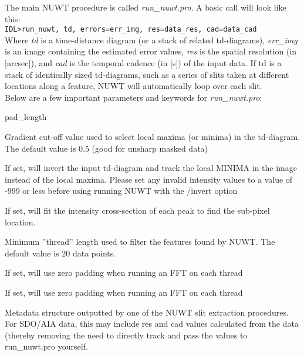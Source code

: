 \documentclass{article}
\begin{document}
The main NUWT procedure is called \textit{run\_nuwt.pro}. A basic call will look like this: \\

\hspace{0.5cm} \texttt{IDL\textgreater run\_nuwt, td, errors=err\_img, res=data\_res, cad=data\_cad} \\

Where \textit{td} is a time-distance diagram (or a stack of related td-diagrams), \textit{err\_img} is an image containing the estimated error values, \textit{res} is the spatial resolution (in [arcsec]), and \textit{cad} is the temporal cadence (in [s]) of the input data. If td is a stack of identically sized td-diagrams, such as a series of slits taken at different locations along a feature, NUWT will automatically loop over each slit. \\

Below are a few important parameters and keywords for \textit{run\_nuwt.pro}: \\

\begin{labeling}{pad\_length}
\item [grad] Gradient cut-off value used to select local maxima (or minima) in the td-diagram. The default value is 0.5 (good for unsharp masked data)
\item [/invert] If set, will invert the input td-diagram and track the local MINIMA in the image instead of the local maxima. Please set any invalid intensity values to a value of -999 or less before using running NUWT with the /invert option
\item [/gauss] If set, will fit the intensity cross-section of each peak to find the sub-pixel location.
\item [min\_tlen] Minimum ''thread'' length used to filter the features found by NUWT. The default value is 20 data points.
\item [/pad\_fft] If set, will use zero padding when running an FFT on each thread
\item [pad\_length] If set, will use zero padding when running an FFT on each thread
\item [slit\_meta] Metadata structure outputted by one of the NUWT slit extraction procedures. For SDO/AIA data, this may include res and cad values calculated from the data (thereby removing the need to directly track and pass the values to run\_nuwt.pro yourself.
\end{labeling}
\end{document}
